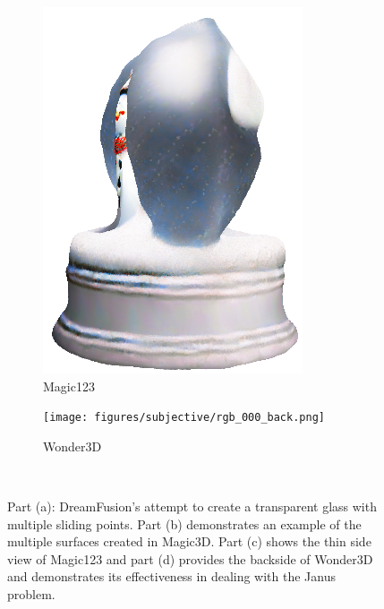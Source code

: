 \begin{figure}[ht]
\begin{subfigure}[b]{0.22\textwidth}
        \includegraphics[width=\textwidth]{figures/subjective/it10000-3.png}
        \vspace{0.1cm}
        \caption{Magic123}
    \end{subfigure}
    \begin{subfigure}[b]{0.25\textwidth}
        \centering
        \texttt{[image: figures/subjective/rgb\_000\_back.png]}
        \vspace{0.1cm}
        \caption{Wonder3D}
    \end{subfigure}
    \caption{Part (a): DreamFusion's attempt to create a transparent glass with multiple sliding points. Part (b) demonstrates an example of the multiple surfaces created in Magic3D. Part (c) shows the thin side view of Magic123 and part (d) provides the backside of Wonder3D and demonstrates its effectiveness in dealing with the Janus problem.}~\label{fig:dreamfusionGlobe}
\end{figure}